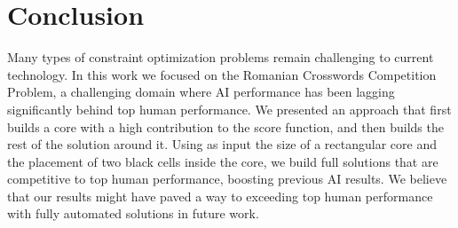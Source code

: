 \section{Conclusion}

Many types of constraint optimization problems remain challenging to current
technology.
In this work we focused on
the Romanian Crosswords Competition Problem,
a challenging domain where AI performance has been lagging significantly behind top human performance.
We presented an approach that first builds a core with a high contribution to the score function,
and then builds the rest of the solution around it.
Using as input the size of a rectangular core and the placement of two black cells inside the core,
we build full solutions that are competitive to top human performance,
boosting previous AI results.
We believe that our results might have paved a way to exceeding top human performance with fully automated solutions in future work.
